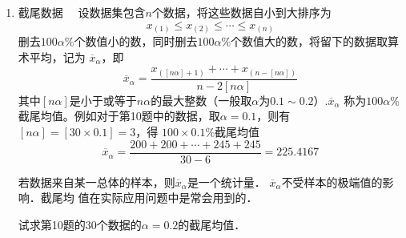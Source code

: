 \documentclass[10pt,a4paper]{article}
\begin{document}
\begin{enumerate}
    \item {\heiti 截尾数据}$\quad$ 设数据集包含$n$个数据，将这些数据自小到大排序为
    $$x_{(1)}\leq x_{(2)} \leq \cdots \leq x_{(n)}$$
    删去$100\alpha \%$个数值小的数，同时删去$100\alpha \%$个数值大的数，将留下的数据取算术平均，记为
    $\overline{x}_\alpha$，即
    $$\overline{x}_\alpha=\frac{x_{([n\alpha]+1)}+\cdots+x_{(n-[n\alpha])}}{n-2[n\alpha]}$$
    其中$[n\alpha]$是小于或等于$n\alpha$的最大整数（一般取$\alpha$为$0.1\sim 0.2$）.$\overline{x}_\alpha$
    称为$100\alpha\%$截尾均值。例如对于第10题中的数据，取$\alpha=0.1$，则有$[n\alpha]=[30\times 0.1]=3$，得
    $100\times 0.1\%$截尾均值
    $$\overline{x}_\alpha=\frac{200+200+\cdots+245+245}{30-6}=225.4167$$
    \par 若数据来自某一总体的样本，则$\overline{x}_\alpha$是一个统计量． $\overline{x}_\alpha$不受样本的极端值的影响．截尾均
    值在实际应用问题中是常会用到的．
    \par 试求第10题的30个数据的$\alpha=0.2$的截尾均值．
    

    


  

\end{enumerate}
\end{document}
